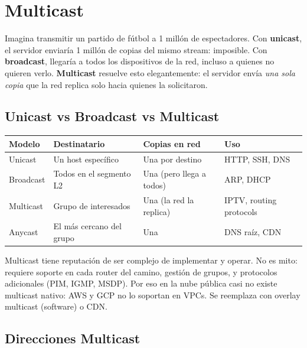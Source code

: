 
\chapter{ Multicast}

Imagina transmitir un partido de fútbol a 1 millón de espectadores. Con \textbf{unicast},
el servidor enviaría 1 millón de copias del mismo stream: imposible. Con
\textbf{broadcast}, llegaría a todos los dispositivos de la red, incluso a quienes no
quieren verlo. \textbf{Multicast} resuelve esto elegantemente: el servidor envía
\emph{una sola copia} que la red replica solo hacia quienes la solicitaron.

\section{ Unicast vs Broadcast vs Multicast}

\begin{center}
\begin{tabular}{llll}
\toprule
\textbf{Modelo} & \textbf{Destinatario} & \textbf{Copias en red} & \textbf{Uso} \\
\midrule
Unicast   & Un host específico       & Una por destino         & HTTP, SSH, DNS \\
Broadcast & Todos en el segmento L2  & Una (pero llega a todos) & ARP, DHCP \\
Multicast & Grupo de interesados     & Una (la red la replica) & IPTV, routing protocols \\
Anycast   & El más cercano del grupo & Una                     & DNS raíz, CDN \\
\bottomrule
\end{tabular}
\end{center}

\begin{cuidado}
Multicast tiene reputación de ser complejo de implementar y operar. No es mito:
requiere soporte en cada router del camino, gestión de grupos, y protocolos adicionales
(PIM, IGMP, MSDP). Por eso en la nube pública casi no existe multicast nativo: AWS
y GCP no lo soportan en VPCs. Se reemplaza con overlay multicast (software) o CDN.
\end{cuidado}

\section{ Direcciones Multicast}

